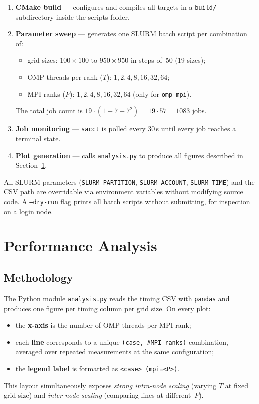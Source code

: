 \documentclass[11pt,a4paper]{article}
\begin{document}
\begin{enumerate}
  \item \textbf{CMake build} --- configures and compiles all targets in a
        \texttt{build/} subdirectory inside the scripts folder.
  \item \textbf{Parameter sweep} --- generates one SLURM batch script per
        combination of:
        \begin{itemize}
          \item grid sizes: $100\times100$ to $950\times950$ in steps of~50
                (19 sizes);
          \item OMP threads per rank ($T$): $1,2,4,8,16,32,64$;
          \item MPI ranks ($P$): $1,2,4,8,16,32,64$ (only for \texttt{omp\_mpi}).
        \end{itemize}
        The total job count is $19\cdot(1 + 7 + 7^2) = 19\cdot57 = 1083$ jobs.
  \item \textbf{Job monitoring} --- \texttt{sacct} is polled every 30\,s until
        every job reaches a terminal state.
  \item \textbf{Plot generation} --- calls \texttt{analysis.py} to produce all
        figures described in Section~\ref{sec:analysis}.
\end{enumerate}

All SLURM parameters (\texttt{SLURM\_PARTITION}, \texttt{SLURM\_ACCOUNT},
\texttt{SLURM\_TIME}) and the CSV path are overridable via environment
variables without modifying source code.  A \texttt{--dry-run} flag prints
all batch scripts without submitting, for inspection on a login node.

\section{Performance Analysis}
\label{sec:analysis}

\subsection{Methodology}

The Python module \texttt{analysis.py} reads the timing CSV with
\texttt{pandas} and produces one figure per timing column per grid size.
On every plot:
\begin{itemize}
  \item the \textbf{x-axis} is the number of OMP threads per MPI rank;
  \item each \textbf{line} corresponds to a unique \texttt{(case, \#MPI~ranks)}
        combination, averaged over repeated measurements at the same
        configuration;
  \item the \textbf{legend label} is formatted as \texttt{<case> (mpi=<P>)}.
\end{itemize}
This layout simultaneously exposes
\emph{strong intra-node scaling} (varying $T$ at fixed grid size) and
\emph{inter-node scaling} (comparing lines at different~$P$).
\end{document}
